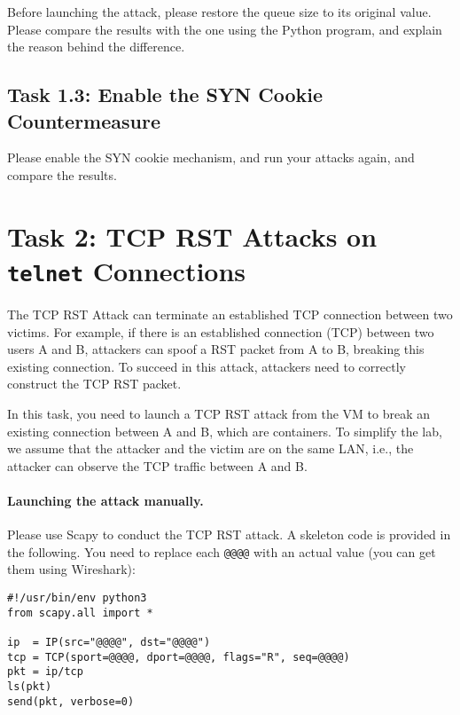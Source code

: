Before launching the attack, please restore the queue size to its 
original value. Please compare the results with the one 
using the Python program, and explain the reason behind the difference. 

 



\subsection{Task 1.3: Enable the SYN Cookie Countermeasure}

Please enable the SYN cookie mechanism, and 
run your attacks again, and compare the results. 



\section {Task 2: TCP RST Attacks on \texttt{telnet} Connections}

The TCP RST Attack can terminate an established TCP connection between
two victims. For example, if there is an established \telnet connection (TCP)
between two users A and B, attackers can spoof a RST packet from A to B,
breaking this existing connection. To succeed in this attack, attackers
need to correctly construct the TCP RST packet. 

In this task, you need to launch a TCP RST attack from the VM 
to break an existing \telnet connection between A and B, which are 
containers.  To simplify the lab,
we assume that the attacker and the victim are on the same LAN,
i.e., the attacker can observe the TCP traffic between
A and B.


\paragraph{Launching the attack manually.} 
Please use Scapy to conduct the TCP RST attack. 
A skeleton code is provided in the following. You need to replace each
\texttt{@@@@} with an actual value (you can get them using Wireshark):  


\begin{lstlisting}
#!/usr/bin/env python3
from scapy.all import *

ip  = IP(src="@@@@", dst="@@@@")
tcp = TCP(sport=@@@@, dport=@@@@, flags="R", seq=@@@@)
pkt = ip/tcp
ls(pkt)
send(pkt, verbose=0)
\end{lstlisting}

